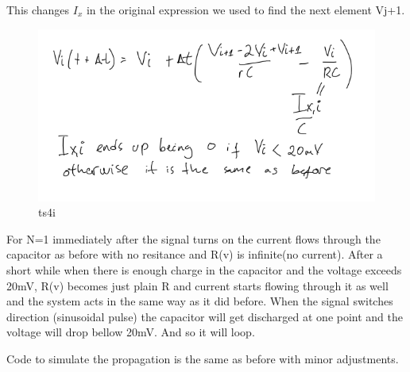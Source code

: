 \documentclass[11pt]{article}
\begin{document}
    This changes \(I_x\) in the original expression we used to find the next
element Vj+1.

    \begin{figure}
\centering
\includegraphics{pics/task4i.png}
\caption{ts4i}
\end{figure}

    For N=1 immediately after the signal turns on the current flows through
the capacitor as before with no resitance and R(v) is infinite(no
current). After a short while when there is enough charge in the
capacitor and the voltage exceeds 20mV, R(v) becomes just plain R and
current starts flowing through it as well and the system acts in the
same way as it did before. When the signal switches direction
(sinusoidal pulse) the capacitor will get discharged at one point and
the voltage will drop bellow 20mV. And so it will loop.

    Code to simulate the propagation is the same as before with minor
adjustments.
\end{document}

